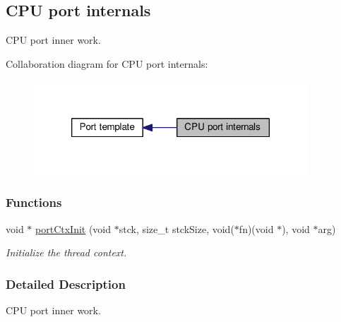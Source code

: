 \hypertarget{group__template__cpu__impl}{\subsection{C\-P\-U port internals}
\label{group__template__cpu__impl}
}


C\-P\-U port inner work.  


Collaboration diagram for C\-P\-U port internals\-:\nopagebreak
\begin{figure}[H]
\begin{center}
\leavevmode
\includegraphics[width=290pt]{group__template__cpu__impl}
\end{center}
\end{figure}
\subsubsection*{Functions}
\begin{DoxyCompactItemize}
\item 
void $\ast$ \hyperlink{group__template__cpu__impl_gaa097ec2ead487892969bcd2806539822}{port\-Ctx\-Init} (void $\ast$stck, size\-\_\-t stck\-Size, void($\ast$fn)(void $\ast$), void $\ast$arg)
\begin{DoxyCompactList}\small\item\em Initialize the thread context. \end{DoxyCompactList}\end{DoxyCompactItemize}


\subsubsection{Detailed Description}
C\-P\-U port inner work. 

